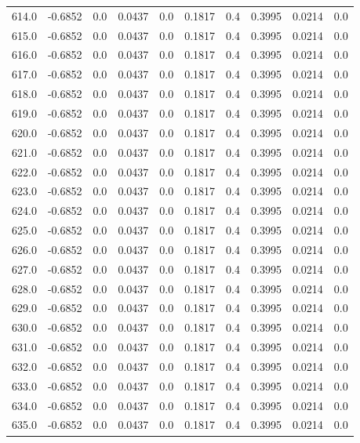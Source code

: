 \begin{longtable}{lrrrrrrrrr}
614.0 & -0.6852 & 0.0 & 0.0437 & 0.0 & 0.1817 & 0.4 & 0.3995 & 0.0214 & 0.0 \\
615.0 & -0.6852 & 0.0 & 0.0437 & 0.0 & 0.1817 & 0.4 & 0.3995 & 0.0214 & 0.0 \\
616.0 & -0.6852 & 0.0 & 0.0437 & 0.0 & 0.1817 & 0.4 & 0.3995 & 0.0214 & 0.0 \\
617.0 & -0.6852 & 0.0 & 0.0437 & 0.0 & 0.1817 & 0.4 & 0.3995 & 0.0214 & 0.0 \\
618.0 & -0.6852 & 0.0 & 0.0437 & 0.0 & 0.1817 & 0.4 & 0.3995 & 0.0214 & 0.0 \\
619.0 & -0.6852 & 0.0 & 0.0437 & 0.0 & 0.1817 & 0.4 & 0.3995 & 0.0214 & 0.0 \\
620.0 & -0.6852 & 0.0 & 0.0437 & 0.0 & 0.1817 & 0.4 & 0.3995 & 0.0214 & 0.0 \\
621.0 & -0.6852 & 0.0 & 0.0437 & 0.0 & 0.1817 & 0.4 & 0.3995 & 0.0214 & 0.0 \\
622.0 & -0.6852 & 0.0 & 0.0437 & 0.0 & 0.1817 & 0.4 & 0.3995 & 0.0214 & 0.0 \\
623.0 & -0.6852 & 0.0 & 0.0437 & 0.0 & 0.1817 & 0.4 & 0.3995 & 0.0214 & 0.0 \\
624.0 & -0.6852 & 0.0 & 0.0437 & 0.0 & 0.1817 & 0.4 & 0.3995 & 0.0214 & 0.0 \\
625.0 & -0.6852 & 0.0 & 0.0437 & 0.0 & 0.1817 & 0.4 & 0.3995 & 0.0214 & 0.0 \\
626.0 & -0.6852 & 0.0 & 0.0437 & 0.0 & 0.1817 & 0.4 & 0.3995 & 0.0214 & 0.0 \\
627.0 & -0.6852 & 0.0 & 0.0437 & 0.0 & 0.1817 & 0.4 & 0.3995 & 0.0214 & 0.0 \\
628.0 & -0.6852 & 0.0 & 0.0437 & 0.0 & 0.1817 & 0.4 & 0.3995 & 0.0214 & 0.0 \\
629.0 & -0.6852 & 0.0 & 0.0437 & 0.0 & 0.1817 & 0.4 & 0.3995 & 0.0214 & 0.0 \\
630.0 & -0.6852 & 0.0 & 0.0437 & 0.0 & 0.1817 & 0.4 & 0.3995 & 0.0214 & 0.0 \\
631.0 & -0.6852 & 0.0 & 0.0437 & 0.0 & 0.1817 & 0.4 & 0.3995 & 0.0214 & 0.0 \\
632.0 & -0.6852 & 0.0 & 0.0437 & 0.0 & 0.1817 & 0.4 & 0.3995 & 0.0214 & 0.0 \\
633.0 & -0.6852 & 0.0 & 0.0437 & 0.0 & 0.1817 & 0.4 & 0.3995 & 0.0214 & 0.0 \\
634.0 & -0.6852 & 0.0 & 0.0437 & 0.0 & 0.1817 & 0.4 & 0.3995 & 0.0214 & 0.0 \\
635.0 & -0.6852 & 0.0 & 0.0437 & 0.0 & 0.1817 & 0.4 & 0.3995 & 0.0214 & 0.0 \\

\end{longtable}
